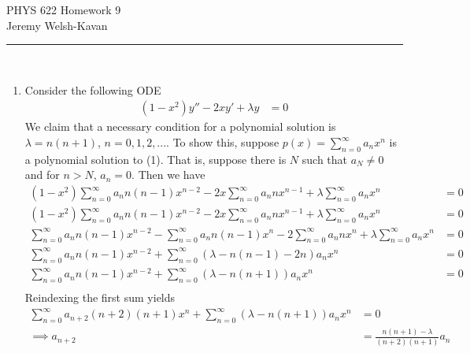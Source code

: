 \documentclass[]{book}
\begin{document}
{\Large PHYS 622 Homework 9}\\
{Jeremy Welsh-Kavan}\\
\vspace{0.2 cm}
\begin{center}
\noindent\rule{15cm}{0.4pt} \\
\end{center}
\begin{enumerate}[1)]
\item
Consider the following ODE
\begin{equation}
\begin{split}
(1-x^2)y'' -2xy' +\lambda y & = 0 
\end{split}
\end{equation}
We claim that a necessary condition for a polynomial solution is $\lambda = n(n+1)$, $n=0,1,2,...$. To show this, suppose $p(x) = \sum_{n=0}^{\infty} a_n x^n$ is a polynomial solution to (1). That is, suppose there is $N$ such that $a_N \ne 0$ and for $n>N$, $a_n = 0$. Then we have
\begin{equation}
\begin{split}
(1-x^2)\sum_{n=0}^{\infty} a_n n(n-1)x^{n-2} -2x\sum_{n=0}^{\infty} a_n nx^{n-1} +\lambda \sum_{n=0}^{\infty} a_n x^n & = 0 \\
(1-x^2)\sum_{n=0}^{\infty} a_n n(n-1)x^{n-2} -2x\sum_{n=0}^{\infty} a_n nx^{n-1} +\lambda \sum_{n=0}^{\infty} a_n x^n & = 0 \\
\sum_{n=0}^{\infty} a_n n(n-1)x^{n-2} - \sum_{n=0}^{\infty} a_n n(n-1)x^{n} -2\sum_{n=0}^{\infty} a_n nx^{n}+\lambda \sum_{n=0}^{\infty} a_n x^n & = 0 \\
\sum_{n=0}^{\infty} a_n n(n-1)x^{n-2} + \sum_{n=0}^{\infty} \left(\lambda -n(n-1) -2n \right) a_n x^n & = 0 \\
\sum_{n=0}^{\infty} a_n n(n-1)x^{n-2} + \sum_{n=0}^{\infty} \left(\lambda -n(n+1)\right) a_n x^n & = 0 \\
\end{split}
\end{equation}
Reindexing the first sum yields
\begin{equation}
\begin{split}
\sum_{n=0}^{\infty} a_{n+2} (n+2)(n+1)x^{n} + \sum_{n=0}^{\infty} \left(\lambda -n(n+1)\right) a_n x^n & = 0 \\
\implies a_{n+2} & = \frac{n(n+1) - \lambda}{(n+2)(n+1)}a_n \\ 
\end{split}

\end{equation}
\end{enumerate}
\end{document}
